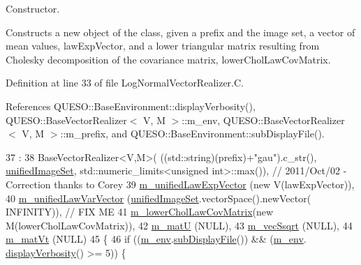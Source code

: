 Constructor. 

Constructs a new object of the class, given a prefix and the image set, a vector of mean values, {\ttfamily law\-Exp\-Vector}, and a lower triangular matrix resulting from Cholesky decomposition of the covariance matrix, {\ttfamily lower\-Chol\-Law\-Cov\-Matrix}. 

Definition at line 33 of file Log\-Normal\-Vector\-Realizer.\-C.



References Q\-U\-E\-S\-O\-::\-Base\-Environment\-::display\-Verbosity(), Q\-U\-E\-S\-O\-::\-Base\-Vector\-Realizer$<$ V, M $>$\-::m\-\_\-env, Q\-U\-E\-S\-O\-::\-Base\-Vector\-Realizer$<$ V, M $>$\-::m\-\_\-prefix, and Q\-U\-E\-S\-O\-::\-Base\-Environment\-::sub\-Display\-File().


\begin{DoxyCode}
37   :
38   BaseVectorRealizer<V,M>( ((std::string)(prefix)+\textcolor{stringliteral}{"gau"}).c\_str(), 
      \hyperlink{class_q_u_e_s_o_1_1_base_vector_realizer_ad958991bab8d6369e8a0d66b22a237d4}{unifiedImageSet}, std::numeric\_limits<unsigned int>::max()), \textcolor{comment}{// 2011/Oct/02 - Correction
       thanks to Corey}
39   \hyperlink{class_q_u_e_s_o_1_1_log_normal_vector_realizer_a896a336c4baf517add5ba372e5120408}{m\_unifiedLawExpVector}  (\textcolor{keyword}{new} V(lawExpVector)),
40   \hyperlink{class_q_u_e_s_o_1_1_log_normal_vector_realizer_a418dbfe867eb80b53ebe3aeaf26d208c}{m\_unifiedLawVarVector}  (\hyperlink{class_q_u_e_s_o_1_1_base_vector_realizer_ad958991bab8d6369e8a0d66b22a237d4}{unifiedImageSet}.vectorSpace().newVector( 
      INFINITY)), \textcolor{comment}{// FIX ME}
41   \hyperlink{class_q_u_e_s_o_1_1_log_normal_vector_realizer_a9a0d52cb94a3de5aa367d4e66f4fa137}{m\_lowerCholLawCovMatrix}(\textcolor{keyword}{new} M(lowerCholLawCovMatrix)),
42   \hyperlink{class_q_u_e_s_o_1_1_log_normal_vector_realizer_ac5d5aae6606895a42ab1c899bdb37906}{m\_matU}                 (NULL),
43   \hyperlink{class_q_u_e_s_o_1_1_log_normal_vector_realizer_ad714ba417a345d76f32d9af389b4dccd}{m\_vecSsqrt}             (NULL),
44   \hyperlink{class_q_u_e_s_o_1_1_log_normal_vector_realizer_a7fcafdfed9d2ec7cc70b87109240754a}{m\_matVt}                (NULL)
45 \{
46   \textcolor{keywordflow}{if} ((\hyperlink{class_q_u_e_s_o_1_1_base_vector_realizer_acde246c52f82d8ed687d91cfac14c29c}{m\_env}.\hyperlink{class_q_u_e_s_o_1_1_base_environment_a8a0064746ae8dddfece4229b9ad374d6}{subDisplayFile}()) && (\hyperlink{class_q_u_e_s_o_1_1_base_vector_realizer_acde246c52f82d8ed687d91cfac14c29c}{m\_env}.
      \hyperlink{class_q_u_e_s_o_1_1_base_environment_a1fe5f244fc0316a0ab3e37463f108b96}{displayVerbosity}() >= 5)) \{

\end{DoxyCode}
